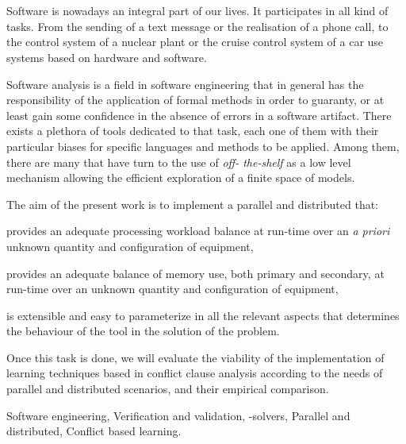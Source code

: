 
\chapter*{\runtitle}

Software is nowadays an integral part of our lives. It participates in all
kind of tasks. From the sending of a text message or the realisation of a
phone call, to the control system of a nuclear plant or the cruise control
system of a car use systems based on hardware and software.

Software analysis is a field in software engineering that in general has the
responsibility of the application of formal methods in order to guaranty, or
at least gain some confidence in the absence of errors in a software artifact.
There exists a plethora of tools dedicated to that task, each one of them with
their particular biases for specific languages and methods to be applied.
Among them, there are many that have turn to the use of \ssolvers \emph{off-
the-shelf}  as a low level mechanism allowing the efficient exploration of a
finite space of models.
 
The aim of the present work is to implement a parallel and distributed
\ssolver that: \begin{inparaenum}[a)]   \item provides an adequate processing
workload balance at run-time over an \emph{a priori} unknown quantity and
configuration of equipment, \item provides an adequate balance of memory use,
both primary and secondary, at run-time over an unknown quantity and
configuration of equipment, \item is extensible and easy to parameterize in
all the relevant aspects that determines the behaviour of the tool in the
solution of the problem. \end{inparaenum} Once this task is done, we will
evaluate the viability of the implementation of learning techniques based in
conflict clause analysis according to the needs of parallel and distributed
scenarios, and their empirical comparison.

\bigskip

 Software engineering, Verification and validation,
\Sat-solvers, Parallel and distributed, Conflict based learning.
